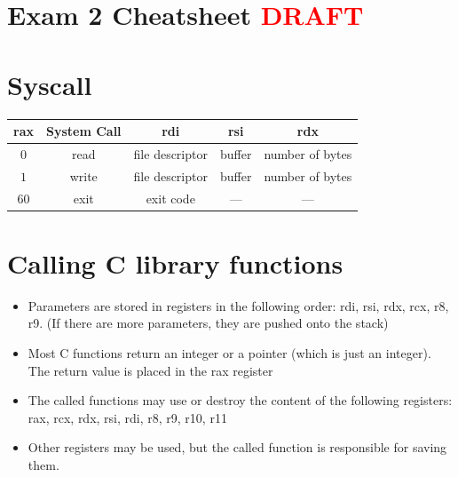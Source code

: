 \documentclass[letterpaper,12pt]{exam}
\newcommand{\unit}{Exam 2 Cheatsheet \textcolor{red}{DRAFT}}
\begin{document}
\section*{\unit}
\section*{Syscall}
\begin{tabular}{| c | c | c | c| c |}
 \hline
    rax & System Call & rdi & rsi & rdx \\
    \hline
    $0$ & read & file descriptor & buffer & number of bytes \\
    \hline
    $1$ & write & file descriptor & buffer & number of bytes \\
    \hline
    $60$ & exit & exit code & --- & --- \\
    \hline
\end{tabular}
\par
\section*{Calling C library functions}

\begin{itemize}
    \item Parameters are stored in registers in the following order: rdi, rsi, rdx, rcx, r8, r9. (If there are more parameters, they are pushed onto the stack)
    \item Most C functions return an integer or a pointer (which is just an integer).  The return value is placed in the rax register
    \item The called functions may use or destroy the content of the following registers: rax, rcx, rdx, rsi, rdi, r8, r9, r10, r11 
    \item Other registers may be used, but the called function is responsible for saving them.
\vspace{15 mm}

\end{itemize}
\par
\end{document}
